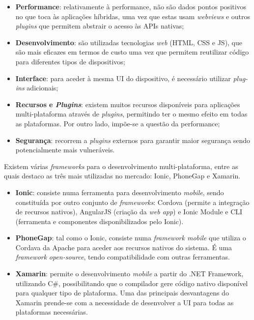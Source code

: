 \begin{itemize}
	\item \textbf{Performance}: relativamente à performance, não são dados pontos positivos no que toca às aplicações híbridas, uma vez que estas usam  \textit{webviews} e outros \textit{plugins} que permitem abstrair o acesso às APIs nativas; 

	\item \textbf{Desenvolvimento}: são utilizadas tecnologias \textit{web} (\ac{HTML}, \ac{CSS} e \ac{JS}), que são mais eficazes em termos de custo uma vez que permitem reutilizar código para diferentes tipos de dispositivos; 
	
	\item \textbf{Interface}: para aceder à mesma \ac{UI} do dispositivo, é necessário utilizar \textit{plug-ins} adicionais; 
	
	\item \textbf{Recursos e \textit{Plugins}}: existem muitos recursos disponíveis para aplicações \linebreak multi-plataforma através de \textit{plugins}, permitindo ter o mesmo efeito em todas as plataformas. Por outro lado, impõe-se a questão da performance; 

	\item \textbf{Segurança}: recorrem a \textit{plugins} externos para garantir maior segurança sendo potencialmente mais vulneráveis.
	
\end{itemize}

Existem várias \textit{frameworks} para o desenvolvimento multi-plataforma, entre as quais destaco as três mais utilizadas no mercado: Ionic, PhoneGap e Xamarin. 

\begin{itemize}
	\item \textbf{Ionic}: consiste numa ferramenta para desenvolvimento \textit{mobile}, sendo constituída por outro conjunto de \textit{frameworks}: Cordova (permite a integração de recursos nativos), AngularJS (criação da \textit{web app}) e Ionic Module e CLI (ferramenta e componentes disponibilizados pelo Ionic)\cite{Ionic2016}. 
	
	\item \textbf{PhoneGap}: tal como o Ionic, consiste numa \textit{framework mobile} que utiliza o Cordava da Apache para aceder aos recursos nativos do sistema. É uma \textit{framework} \textit{open-source}, tendo compatibilidade com outras ferramentas. 
	
	\item \textbf{Xamarin}: permite o desenvolvimento \textit{mobile} a partir do .NET Framework, utilizando C\#, possibilitando que o compilador gere código nativo disponível para qualquer tipo de plataforma. Uma das principais desvantagens do Xamarin prende-se com a necessidade de desenvolver a \ac{UI} para todas as plataformas necessárias. 
\end{itemize}

